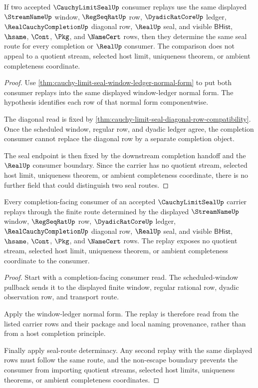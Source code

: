 \begin{theorem}
\label{thm:cauchy-limit-seal-seal-route-determinacy}
If two accepted $\CauchyLimitSealUp$ consumer replays use the same displayed $\StreamNameUp$ window, $\RegSeqRatUp$ row, $\DyadicRatCoreUp$ ledger, $\RealCauchyCompletionUp$ diagonal row, $\RealUp$ seal, and visible $\mathsf{BHist}$, $\hsame$, $\Cont$, $\Pkg$, and $\NameCert$ rows, then they determine the same seal route for every completion or $\RealUp$ consumer. The comparison does not appeal to a quotient stream, selected host limit, uniqueness theorem, or ambient completeness coordinate.
\end{theorem}
\begin{proof}
Use \autoref{thm:cauchy-limit-seal-window-ledger-normal-form} to put both consumer replays into the same displayed window-ledger normal form. The hypothesis identifies each row of that normal form componentwise.

The diagonal read is fixed by \autoref{thm:cauchy-limit-seal-diagonal-row-compatibility}. Once the scheduled window, regular row, and dyadic ledger agree, the completion consumer cannot replace the diagonal row by a separate completion object.

The seal endpoint is then fixed by the downstream completion handoff and the $\RealUp$ consumer boundary. Since the carrier has no quotient stream, selected host limit, uniqueness theorem, or ambient completeness coordinate, there is no further field that could distinguish two seal routes.
\end{proof}

\begin{theorem}
\label{thm:cauchy-limit-seal-completion-consumer-replay}
Every completion-facing consumer of an accepted $\CauchyLimitSealUp$ carrier replays through the finite route determined by the displayed $\StreamNameUp$ window, $\RegSeqRatUp$ row, $\DyadicRatCoreUp$ ledger, $\RealCauchyCompletionUp$ diagonal row, $\RealUp$ seal, and visible $\mathsf{BHist}$, $\hsame$, $\Cont$, $\Pkg$, and $\NameCert$ rows. The replay exposes no quotient stream, selected host limit, uniqueness theorem, or ambient completeness coordinate to the consumer.
\end{theorem}
\begin{proof}
Start with a completion-facing consumer read. The scheduled-window pullback sends it to the displayed finite window, regular rational row, dyadic observation row, and transport route.

Apply the window-ledger normal form. The replay is therefore read from the listed carrier rows and their package and local naming provenance, rather than from a host completion principle.

Finally apply seal-route determinacy. Any second replay with the same displayed rows must follow the same route, and the non-escape boundary prevents the consumer from importing quotient streams, selected host limits, uniqueness theorems, or ambient completeness coordinates.
\end{proof}

